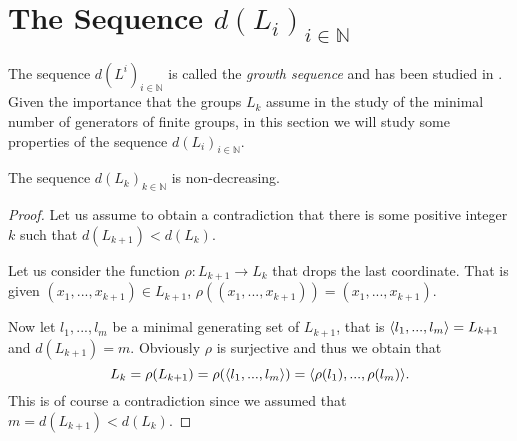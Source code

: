\section{The Sequence \texorpdfstring{$d(L_i)_{i \in \mathbb{N}}$}{dLiN}}

The sequence $d(L^i)_{i \in \mathbb{N}}$ is called the \textit{growth sequence} and has been studied in \cite{WiegoldGSFG, WiegoldGSFGII, WiegoldGSFGIII, WiegoldGSFGIV}. Given the importance that the groups $L_k$ assume in the study of the minimal number of generators of finite groups, in this section we will study some properties of the sequence $d(L_i)_{i \in \mathbb{N}}$. 

\begin{theorem}
    The sequence $d(L_k)_{k \in \mathbb{N}}$ is non-decreasing.
\end{theorem}

\begin{proof}
    Let us assume to obtain a contradiction that there is some positive integer $k$ such that $d(L_{k+1}) < d(L_k)$. 
    
    Let us consider the function $\rho: L_{k+1} \rightarrow L_k$ that drops the last coordinate. That is given $(x_1,...,x_{k+1}) \in L_{k+1}$, $\rho((x_1,...,x_{k+1})) = (x_1,...,x_{k+1})$.

    Now let $l_1,...,l_m$ be a minimal generating set of $L_{k+1}$, that is $
    \langle l_1,...,l_m \rangle = L_{k+1}$ and $d(L_{k+1}) = m$.
    Obviously $\rho$ is surjective and thus we obtain that 
    $$
    L_k = \rho(L_{k+1}) = \rho(\langle l_1,...,l_m \rangle) = \langle \rho(l_1),...,\rho(l_m) \rangle.
    $$
    This is of course a contradiction since we assumed that $m = d(L_{k+1}) < d(L_k)$.
\end{proof}

